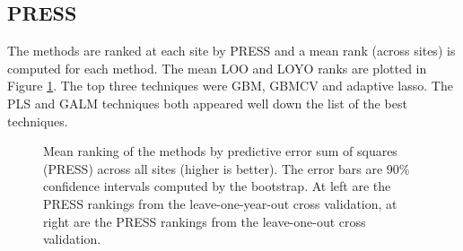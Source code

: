 \documentclass[english]{article}\usepackage[]{graphicx}\usepackage[]{color}
\newenvironment{knitrout}{}{} %
\numberwithin{equation}{section}
\numberwithin{figure}{section}
\renewcommand\[{\begin{equation}}
\renewcommand\]{\end{equation}}
\begin{document}
\subsection{PRESS}

The methods are ranked at each site by PRESS and a mean rank (across
sites) is computed for each method. The mean LOO and LOYO ranks are
plotted in Figure \ref{fig:press-boxplot}. The top three techniques
were GBM, GBMCV and adaptive lasso. The PLS and GALM techniques both
appeared well down the list of the best techniques.

\begin{knitrout}
\color{fgcolor}\begin{figure}[]
\caption[Mean ranking of the methods by predictive error sum of squares (PRESS) across all sites (higher is better)]{Mean ranking of the methods by predictive error sum of squares (PRESS) across all sites (higher is better). The error bars are 90\% confidence intervals computed by the bootstrap. At left are the PRESS rankings from the leave-one-year-out cross validation, at right are the PRESS rankings from the leave-one-out cross validation.\label{fig:press-boxplot}}
\end{figure}


\end{knitrout}
\end{document}
